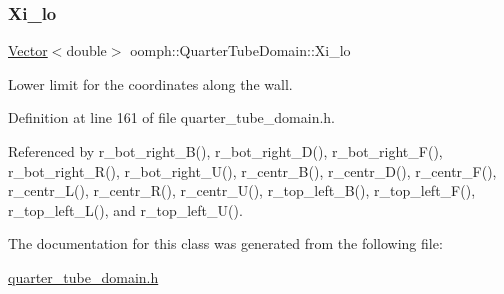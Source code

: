 \subsubsection{\texorpdfstring{Xi\+\_\+lo}{Xi\_lo}}
{\footnotesize\ttfamily \hyperlink{classoomph_1_1Vector}{Vector}$<$double$>$ oomph\+::\+Quarter\+Tube\+Domain\+::\+Xi\+\_\+lo\hspace{0.3cm}{\ttfamily [private]}}



Lower limit for the coordinates along the wall. 



Definition at line 161 of file quarter\+\_\+tube\+\_\+domain.\+h.



Referenced by r\+\_\+bot\+\_\+right\+\_\+\+B(), r\+\_\+bot\+\_\+right\+\_\+\+D(), r\+\_\+bot\+\_\+right\+\_\+\+F(), r\+\_\+bot\+\_\+right\+\_\+\+R(), r\+\_\+bot\+\_\+right\+\_\+\+U(), r\+\_\+centr\+\_\+\+B(), r\+\_\+centr\+\_\+\+D(), r\+\_\+centr\+\_\+\+F(), r\+\_\+centr\+\_\+\+L(), r\+\_\+centr\+\_\+\+R(), r\+\_\+centr\+\_\+\+U(), r\+\_\+top\+\_\+left\+\_\+\+B(), r\+\_\+top\+\_\+left\+\_\+\+F(), r\+\_\+top\+\_\+left\+\_\+\+L(), and r\+\_\+top\+\_\+left\+\_\+\+U().



The documentation for this class was generated from the following file\+:\begin{DoxyCompactItemize}
\item 
\hyperlink{quarter__tube__domain_8h}{quarter\+\_\+tube\+\_\+domain.\+h}\end{DoxyCompactItemize}
